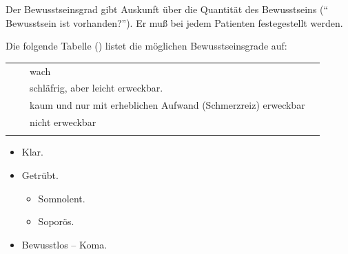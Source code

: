 {
\label{topic:bewusstseinsstoerung-grade}

Der Bewusstseinsgrad gibt Auskunft über die Quantität des Bewusstseins ("` Bewusstsein ist
vorhanden?"'). Er muß bei jedem Patienten festegestellt werden.

Die folgende Tabelle () listet die möglichen
Bewusstseinsgrade auf:

\begin{minipage}{\linewidth}

\begin{tabulary}{\linewidth}{LLLL}
\addlinespace
{}
 &
 &
 wach
 &
\\\addlinespace
{}
&
\noindent{} 
 &
schläfrig, aber leicht erweckbar.
 &
\\
 &
\noindent{} 
 &
 kaum und nur mit erheblichen Aufwand (Schmerzreiz)
 erweckbar 
 &
\noindent{}
\\\addlinespace
{}
 &
\noindent{}
 &
 nicht erweckbar
 &
\noindent{}
\\\addlinespace\bottomrule
\end{tabulary}
\end{minipage}

}{
\begin{itemize}
  \item Klar.
  \item Getrübt.
  \begin{itemize}
    \item Somnolent.
    \item Soporös.
  \end{itemize}
  \item Bewusstlos -- Koma.
\end{itemize}

}{}{}{}

